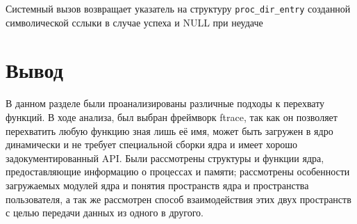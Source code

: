 Системный вызов возвращает указатель на структуру \texttt{proc\_dir\_entry} созданной символической сслыки в случае успеха и NULL при неудаче

\section*{Вывод}

В данном разделе были проанализированы различные подходы к перехвату функций. 
В ходе анализа, был выбран фреймворк ftrace, так как он позволяет перехватить любую функцию зная лишь её имя, может быть загружен в ядро динамически и не требует специальной сборки ядра и имеет хорошо задокументированный API. Были рассмотрены структуры и функции ядра, предоставляющие информацию о процессах и памяти; рассмотрены особенности загружаемых модулей ядра и понятия пространств
ядра и пространства пользователя, а так же рассмотрен способ взаимодействия этих двух пространств с целью передачи данных из одного в другого.
